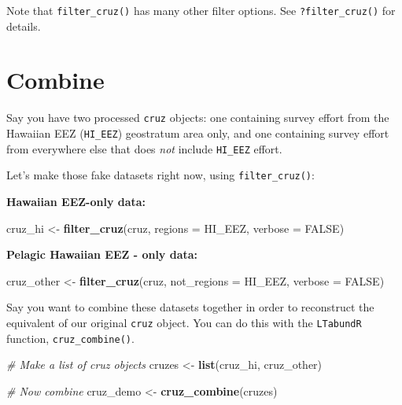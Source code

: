 \documentclass[
]{book}
\newenvironment{Shaded}{\begin{snugshade}}{\end{snugshade}}
\newcommand{\AttributeTok}[1]{\textcolor[rgb]{0.13,0.29,0.53}{#1}}
\newcommand{\CommentTok}[1]{\textcolor[rgb]{0.56,0.35,0.01}{\textit{#1}}}
\newcommand{\ConstantTok}[1]{\textcolor[rgb]{0.56,0.35,0.01}{#1}}
\newcommand{\FunctionTok}[1]{\textcolor[rgb]{0.13,0.29,0.53}{\textbf{#1}}}
\newcommand{\NormalTok}[1]{#1}
\newcommand{\OtherTok}[1]{\textcolor[rgb]{0.56,0.35,0.01}{#1}}
\newcommand{\StringTok}[1]{\textcolor[rgb]{0.31,0.60,0.02}{#1}}
\begin{document}
Note that \texttt{filter\_cruz()} has many other filter options. See \texttt{?filter\_cruz()} for details.

\hypertarget{combine}{%
\section*{Combine}\label{combine}}

Say you have two processed \texttt{cruz} objects: one containing survey effort from the Hawaiian EEZ (\texttt{HI\_EEZ}) geostratum area only, and one containing survey effort from everywhere else that does \emph{not} include \texttt{HI\_EEZ} effort.

Let's make those fake datasets right now, using \texttt{filter\_cruz()}:

\textbf{Hawaiian EEZ-only data:}

\begin{Shaded}
\begin{Highlighting}[]
\NormalTok{cruz\_hi }\OtherTok{\textless{}{-}} \FunctionTok{filter\_cruz}\NormalTok{(cruz, }
                            \AttributeTok{regions =} \StringTok{\textquotesingle{}HI\_EEZ\textquotesingle{}}\NormalTok{, }
                            \AttributeTok{verbose =} \ConstantTok{FALSE}\NormalTok{)}
\end{Highlighting}
\end{Shaded}

\textbf{Pelagic Hawaiian EEZ - only data:}

\begin{Shaded}
\begin{Highlighting}[]
\NormalTok{cruz\_other }\OtherTok{\textless{}{-}} \FunctionTok{filter\_cruz}\NormalTok{(cruz, }
                           \AttributeTok{not\_regions =} \StringTok{\textquotesingle{}HI\_EEZ\textquotesingle{}}\NormalTok{, }
                           \AttributeTok{verbose =} \ConstantTok{FALSE}\NormalTok{)}
\end{Highlighting}
\end{Shaded}

Say you want to combine these datasets together in order to reconstruct the equivalent of our original \texttt{cruz} object. You can do this with the \texttt{LTabundR} function, \texttt{cruz\_combine()}.

\begin{Shaded}
\begin{Highlighting}[]
\CommentTok{\# Make a list of cruz objects}
\NormalTok{cruzes }\OtherTok{\textless{}{-}} \FunctionTok{list}\NormalTok{(cruz\_hi, cruz\_other)}

\CommentTok{\# Now combine}
\NormalTok{cruz\_demo }\OtherTok{\textless{}{-}} \FunctionTok{cruz\_combine}\NormalTok{(cruzes)}
\end{Highlighting}
\end{Shaded}
\end{document}
